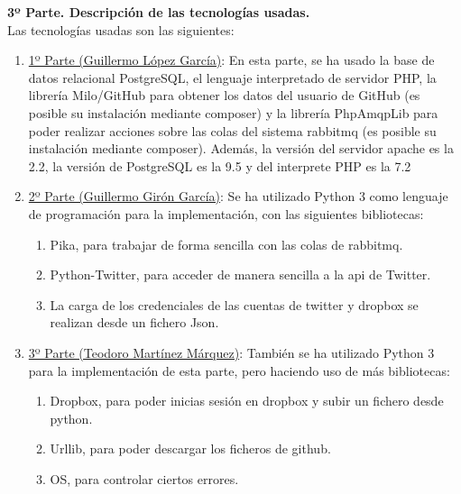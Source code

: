 \documentclass{article}
\begin{document}
\textbf{3º Parte. Descripción de las tecnologías usadas.}\\
Las tecnologías usadas son las siguientes:
\begin{enumerate}
    \item \underline{1º Parte (Guillermo López García)}: En esta parte, se ha usado
        la base de datos relacional PostgreSQL, el lenguaje interpretado de servidor
        PHP, la librería Milo/GitHub para obtener los datos del usuario de GitHub
        (es posible su instalación mediante composer) y la librería PhpAmqpLib para
        poder realizar acciones sobre las colas del sistema rabbitmq (es posible su
        instalación mediante composer). Además, la versión del servidor apache es la
        2.2, la versión de PostgreSQL es la 9.5 y del interprete PHP es la 7.2
    \item \underline{2º Parte (Guillermo Girón García)}: Se ha utilizado Python 3 como
    lenguaje de programación para la implementación, con las siguientes bibliotecas:
    \begin{enumerate}
        \item Pika, para trabajar de forma sencilla con las colas de rabbitmq. 
        \item Python-Twitter, para acceder de manera sencilla a la api de Twitter. 
        \item La carga de los credenciales de las cuentas de twitter y dropbox se realizan desde un fichero Json.
    \end{enumerate} 
    \item \underline{3º Parte (Teodoro Martínez Márquez)}: También se ha utilizado Python 3
	para la implementación de esta parte, pero haciendo uso de más bibliotecas:
    \begin{enumerate}
	\item Dropbox, para poder inicias sesión en dropbox y subir un fichero desde python.
	\item Urllib, para poder descargar los ficheros de github.
	\item OS, para controlar ciertos errores.
    \end{enumerate}
	
\end{enumerate}
\end{document}
